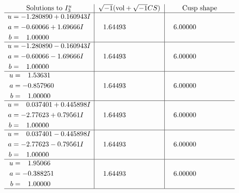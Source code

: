 \documentclass[1p]{elsarticle_modified}
\theoremstyle{definition}
\newcommand{\I}{\sqrt{-1}}
\begin{document}
$$\begin{array}{c|c|c}  
\text{Solutions to }I^u_{3}& \I (\text{vol} + \sqrt{-1}CS) & \text{Cusp shape}\\
 \hline 
\begin{aligned}
u &= -1.280890 + 0.160943 I \\
a &= -0.60066 + 1.69666 I \\
b &= \phantom{-}1.00000\phantom{ +0.000000I}\end{aligned}
 & \phantom{-}1.64493\phantom{ +0.000000I} & \phantom{-}6.00000\phantom{ +0.000000I} \\ \hline\begin{aligned}
u &= -1.280890 - 0.160943 I \\
a &= -0.60066 - 1.69666 I \\
b &= \phantom{-}1.00000\phantom{ +0.000000I}\end{aligned}
 & \phantom{-}1.64493\phantom{ +0.000000I} & \phantom{-}6.00000\phantom{ +0.000000I} \\ \hline\begin{aligned}
u &= \phantom{-}1.53631\phantom{ +0.000000I} \\
a &= -0.857960\phantom{ +0.000000I} \\
b &= \phantom{-}1.00000\phantom{ +0.000000I}\end{aligned}
 & \phantom{-}1.64493\phantom{ +0.000000I} & \phantom{-}6.00000\phantom{ +0.000000I} \\ \hline\begin{aligned}
u &= \phantom{-}0.037401 + 0.445898 I \\
a &= -2.77623 + 0.79561 I \\
b &= \phantom{-}1.00000\phantom{ +0.000000I}\end{aligned}
 & \phantom{-}1.64493\phantom{ +0.000000I} & \phantom{-}6.00000\phantom{ +0.000000I} \\ \hline\begin{aligned}
u &= \phantom{-}0.037401 - 0.445898 I \\
a &= -2.77623 - 0.79561 I \\
b &= \phantom{-}1.00000\phantom{ +0.000000I}\end{aligned}
 & \phantom{-}1.64493\phantom{ +0.000000I} & \phantom{-}6.00000\phantom{ +0.000000I} \\ \hline\begin{aligned}
u &= \phantom{-}1.95066\phantom{ +0.000000I} \\
a &= -0.388251\phantom{ +0.000000I} \\
b &= \phantom{-}1.00000\phantom{ +0.000000I}\end{aligned}
 & \phantom{-}1.64493\phantom{ +0.000000I} & \phantom{-}6.00000\phantom{ +0.000000I}\\
 \hline 
 \end{array}$$\newpage\newpage\renewcommand{\arraystretch}{1}
\end{document}
